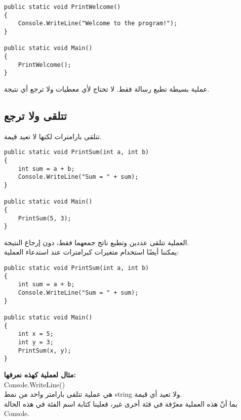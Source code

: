 \documentclass[12pt]{article}
\begin{document}
\begin{boxExample}
\begin{english}
\begin{verbatim}
public static void PrintWelcome()
{
    Console.WriteLine("Welcome to the program!");
}

public static void Main()
{
    PrintWelcome();
}
\end{verbatim}
\end{english}
\end{boxExample}

عملية بسيطة تطبع رسالة فقط. لا تحتاج لأي معطيات ولا ترجع أي نتيجة.

\subsection{تتلقى ولا ترجع}
تتلقى بارامترات لكنها لا تعيد قيمة.

\begin{boxExample}[1]
\begin{english}
\begin{verbatim}
public static void PrintSum(int a, int b)
{
    int sum = a + b;
    Console.WriteLine("Sum = " + sum);
}

public static void Main()
{
    PrintSum(5, 3);
}
\end{verbatim}
\end{english}
\end{boxExample}

العملية تتلقى عددين وتطبع ناتج جمعهما فقط، دون إرجاع النتيجة. \\

يمكننا أيضًا استخدام متغيرات كبرامترات عند استدعاء العملية:
\begin{boxExample}[2]
\begin{english}
\begin{verbatim}
public static void PrintSum(int a, int b)
{
    int sum = a + b;
    Console.WriteLine("Sum = " + sum);
}

public static void Main()
{
    int x = 5;
    int y = 3;
    PrintSum(x, y);
}
\end{verbatim}
\end{english}
\end{boxExample}

\textbf{مثال لعملية كهذه نعرفها:} \\
\textenglish{Console.WriteLine()} \\
هي عملية تتلقى بارامتر واحد من نمط \textenglish{string} ولا تعيد أي قيمة. \\
بما أنّ هذه العملية معرّفة في فئة أخرى غير، فعلينا كتابة اسم الفئة في هذه الحالة \textenglish{Console}.
\end{document}
